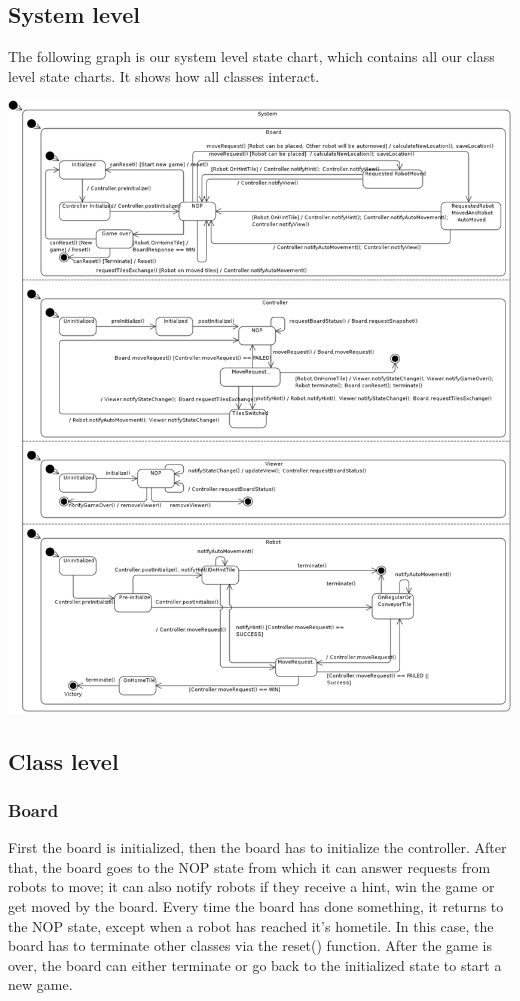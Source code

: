 \subsection{System level}
	The following graph is our system level state chart, which contains all our class level state charts. It shows how all classes interact.

	\includegraphics[width=\linewidth]{statecharts/system.pdf}

\subsection{Class level}
	\subsubsection{Board}
	First the board is initialized, then the board has to initialize the controller. After that, the board goes to the NOP state from which it can answer requests from robots to move; it can also notify robots if they receive a hint, win the game or get moved by the board. Every time the board has done something, it returns to the NOP state, except when a robot has reached it's hometile. In this case, the board has to terminate other classes via the reset() function. After the game is over, the board can either terminate or go back to the initialized state to start a new game.
	
